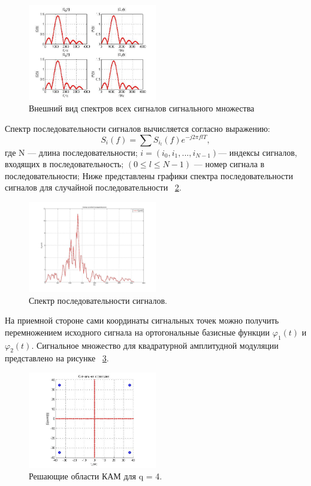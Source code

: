 \begin{figure}[H]
 	\centering
 	\includegraphics[width=0.5\textwidth]{img/mal4}
 	\caption{Внешний вид спектров всех сигналов сигнального множества}
 	\label{fig:mal4}
\end{figure}
Спектр последовательности сигналов вычисляется согласно выражению:
\begin{equation}
S_{i}(f)=\sum S_{i_{l}}(f)e^{-j2\pi flT},
\end{equation}
где N --- длина последовательности; $i=(i_{0},i_{1},...,i_{N-1})$--- индексы сигналов, входящих в последовательность; $(0\leq l\leq N-1)$ --- номер сигнала в последовательности; 
Ниже представлены графики спектра последовательности сигналов для случайной последовательности ~\ref{fig:mal5}.
\begin{figure}[H]
	\centering
	\includegraphics[width=0.5\textwidth]{img/mal5}
	\caption{Спектр последовательности сигналов.}
	\label{fig:mal5}
\end{figure} 
 
 На приемной стороне сами координаты сигнальных точек можно получить перемножением исходного сигнала   на ортогональные базисные функции $ \varphi_{1}(t)$ и $\varphi_{2}(t)$. Сигнальное множество для квадратурной амплитудной модуляции представлено на рисунке ~\ref{fig:mal6}.
 
 \begin{figure}[H]
 	\centering
 	\includegraphics[width=0.5\textwidth]{img/mal6}
 	\caption{Решающие области КАМ для q = 4.}
 	\label{fig:mal6}
 \end{figure} 
